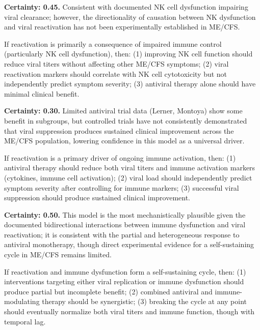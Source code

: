 \begin{hypothesis}
\label{hyp:viral-reactivation-consequence}

\textbf{Certainty: 0.45.} Consistent with documented NK cell dysfunction impairing viral clearance; however, the directionality of causation between NK dysfunction and viral reactivation has not been experimentally established in ME/CFS.

If reactivation is primarily a consequence of impaired immune control (particularly NK cell dysfunction), then: (1) improving NK cell function should reduce viral titers without affecting other ME/CFS symptoms; (2) viral reactivation markers should correlate with NK cell cytotoxicity but not independently predict symptom severity; (3) antiviral therapy alone should have minimal clinical benefit.
\end{hypothesis}

\begin{speculation}
\label{spec:viral-reactivation-cause}

\textbf{Certainty: 0.30.} Limited antiviral trial data (Lerner, Montoya) show some benefit in subgroups, but controlled trials have not consistently demonstrated that viral suppression produces sustained clinical improvement across the ME/CFS population, lowering confidence in this model as a universal driver.

If reactivation is a primary driver of ongoing immune activation, then: (1) antiviral therapy should reduce both viral titers and immune activation markers (cytokines, immune cell activation); (2) viral load should independently predict symptom severity after controlling for immune markers; (3) successful viral suppression should produce sustained clinical improvement.
\end{speculation}

\begin{hypothesis}
\label{hyp:viral-reactivation-bidirectional}

\textbf{Certainty: 0.50.} This model is the most mechanistically plausible given the documented bidirectional interactions between immune dysfunction and viral reactivation; it is consistent with the partial and heterogeneous response to antiviral monotherapy, though direct experimental evidence for a self-sustaining cycle in ME/CFS remains limited.

If reactivation and immune dysfunction form a self-sustaining cycle, then: (1) interventions targeting either viral replication or immune dysfunction should produce partial but incomplete benefit; (2) combined antiviral and immune-modulating therapy should be synergistic; (3) breaking the cycle at any point should eventually normalize both viral titers and immune function, though with temporal lag.
\end{hypothesis}

